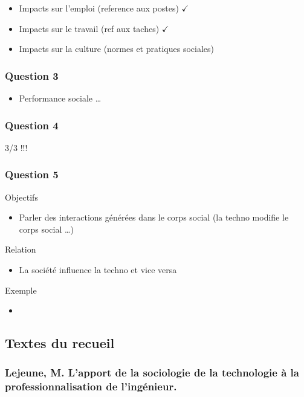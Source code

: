 \documentclass[11pt]{article}
\begin{document}
\begin{itemize}
\item Impacts sur l'emploi (reference aux postes) \(\checkmark\)
\item Impacts sur le travail (ref aux taches) \(\checkmark\)
\item Impacts sur la culture (normes et pratiques sociales)
\end{itemize}

\subsubsection{Question 3}
\label{sec:org4fefa4e}

\begin{itemize}
\item Performance sociale \ldots{}
\end{itemize}

\subsubsection{Question 4}
\label{sec:org6d720af}

3/3 !!!

\subsubsection{Question 5}
\label{sec:orgaaefcab}

Objectifs
\begin{itemize}
\item Parler des interactions générées dans le corps social (la techno modifie le
corps social \ldots{})
\end{itemize}
Relation
\begin{itemize}
\item La société influence la techno et vice versa
\end{itemize}

Exemple
\begin{itemize}
\item 
\end{itemize}
\subsection{Textes du recueil}
\label{sec:org28a2128}
\subsubsection{Lejeune, M. L'apport de la sociologie de la technologie à la professionnalisation de l'ingénieur.}
\label{sec:orgae5f929}
\end{document}

